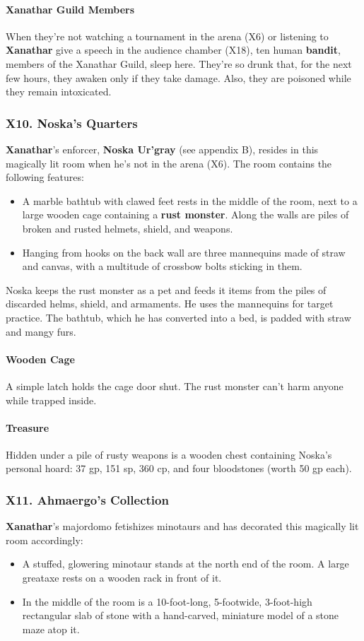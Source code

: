 \documentclass[10pt,a4paper,twoside,twocolumn,openany,nodeprecatedcode]{dndbook}
\begin{document}
\paragraph{Xanathar Guild Members}
When they're not watching a tournament in the arena (X6) or listening to \textbf{Xanathar} give a speech in the audience chamber (X18), ten human \textbf{bandit}, members of the Xanathar Guild, sleep here. They're so drunk that, for the next few hours, they awaken only if they take damage. Also, they are poisoned while they remain intoxicated.
\subsubsection{X10. Noska's Quarters}
\textbf{Xanathar}'s enforcer, \textbf{Noska Ur'gray} (see appendix B), resides in this magically lit room when he's not in the arena (X6). The room contains the following features:
\begin{itemize}

\item A marble bathtub with clawed feet rests in the middle of the room, next to a large wooden cage containing a \textbf{rust monster}. Along the walls are piles of broken and rusted helmets, shield, and weapons.
\item Hanging from hooks on the back wall are three mannequins made of straw and canvas, with a multitude of crossbow bolts sticking in them.
\end{itemize}


Noska keeps the rust monster as a pet and feeds it items from the piles of discarded helms, shield, and armaments. He uses the mannequins for target practice. The bathtub, which he has converted into a bed, is padded with straw and mangy furs.
\paragraph{Wooden Cage}
A simple latch holds the cage door shut. The rust monster can't harm anyone while trapped inside.
\paragraph{Treasure}
Hidden under a pile of rusty weapons is a wooden chest containing Noska's personal hoard: 37 gp, 151 sp, 360 cp, and four bloodstones (worth 50 gp each).
\subsubsection{X11. Ahmaergo's Collection}
\textbf{Xanathar}'s majordomo fetishizes minotaurs and has decorated this magically lit room accordingly:
\begin{itemize}

\item A stuffed, glowering minotaur stands at the north end of the room. A large greataxe rests on a wooden rack in front of it.
\item In the middle of the room is a 10-foot-long, 5-footwide, 3-foot-high rectangular slab of stone with a hand-carved, miniature model of a stone maze atop it.
\end{itemize}
\end{document}
